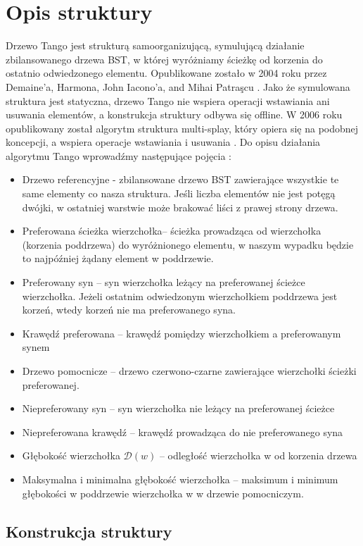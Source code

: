 \documentclass[declaration,shortabstract]{iithesis}
\theoremstyle{thm}
\theoremstyle{remark}
\theoremstyle{plain}
\theoremstyle{plain}
\theoremstyle{plain}
\begin{document}
 \section{Opis struktury} 
Drzewo Tango jest strukturą samoorganizującą, symulującą działanie zbilansowanego drzewa BST, w której wyróżniamy ścieżkę od korzenia do ostatnio odwiedzonego elementu. Opublikowane zostało w 2004 roku przez  Demaine'a, Harmona, John Iacono'a, and Mihai Patraşcu \cite{doi:10.1137/S0097539705447347}. Jako że symulowana struktura jest statyczna, drzewo Tango nie wspiera operacji wstawiania ani usuwania elementów, a konstrukcja struktury odbywa się offline. W 2006 roku opublikowany został algorytm struktura multi-splay, który opiera się na podobnej koncepcji, a wspiera operacje wstawiania i usuwania \cite{wang2006multi}. Do opisu działania algorytmu Tango wprowadźmy następujące pojęcia : 
 \begin{itemize} 
 \item{Drzewo referencyjne - zbilansowane drzewo BST zawierające wszystkie te same elementy co nasza struktura. Jeśli liczba elementów nie jest potęgą dwójki, w ostatniej warstwie może brakować liści z prawej strony drzewa.} 
 \item{Preferowana ścieżka wierzchołka– ścieżka prowadząca od wierzchołka (korzenia poddrzewa) do wyróżnionego elementu, w naszym wypadku będzie to najpóźniej  żądany element w poddrzewie.} 
 \item{Preferowany syn – syn wierzchołka leżący na preferowanej ścieżce wierzchołka. Jeżeli ostatnim odwiedzonym wierzchołkiem poddrzewa jest korzeń, wtedy korzeń nie ma preferowanego syna.} 
 \item{Krawędź preferowana – krawędź pomiędzy wierzchołkiem a preferowanym synem} 
 \item{Drzewo pomocnicze -- drzewo czerwono-czarne \cite{Cormen:2009:IAT:1614191} zawierające wierzchołki ścieżki preferowanej.} 
 \item{Niepreferowany syn – syn wierzchołka nie leżący na preferowanej ścieżce} 
 \item{Niepreferowana krawędź – krawędź prowadząca do nie preferowanego syna} 
 \item{Głębokość wierzchołka \(\mathcal{D}(w)\) -- odległość wierzchołka w od korzenia drzewa} 
 \item{Maksymalna i minimalna głębokość wierzchołka -- maksimum i minimum głębokości w poddrzewie wierzchołka w w drzewie pomocniczym.} 
 \end{itemize} 
 \subsection{Konstrukcja struktury}  
\end{document}
